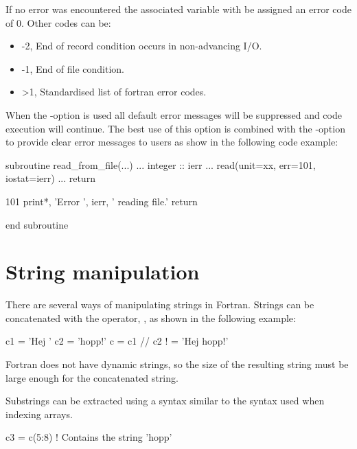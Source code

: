 If no error was encountered the associated variable with be assigned an error code of 0. Other codes can be:

\begin{itemize}
\item -2, End of record condition occurs in non-advancing I/O.
\item -1, End of file condition. 
\item >1, Standardised list of fortran error codes.
\end{itemize}


When the -option is used all default error messages will be suppressed and code execution will continue. The best use of this option is combined with the -option to provide clear error messages to users as show in the following code example:

\begin{fortrancodeenv}
subroutine read_from_file(...)
    ...
    integer :: ierr
    ...
    read(unit=xx, err=101, iostat=ierr)
    ...
    return

101 print*, 'Error ', ierr, ' reading file.' 
    return
    
end subroutine
\end{fortrancodeenv}

\section{String manipulation}

There are several ways of manipulating strings in Fortran. Strings can be concatenated with the operator, \foper{//}, as shown in the following example:

\begin{fortrancodeenv}
c1 = 'Hej '
c2 = 'hopp!'
c = c1 // c2 ! = 'Hej hopp!'
\end{fortrancodeenv}

Fortran does not have dynamic strings, so the size of the resulting string must be large enough for the concatenated string.

Substrings can be extracted using a syntax similar to the syntax used when indexing arrays.

\begin{fortrancodeenv}
c3 = c(5:8) ! Contains the string 'hopp'
\end{fortrancodeenv}


